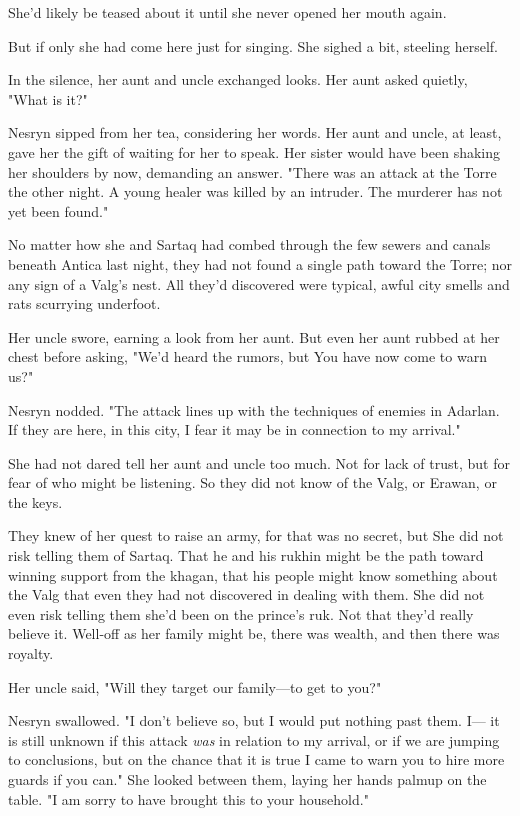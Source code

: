 She'd likely be teased about it until she never opened her mouth again.

But if only she had come here just for singing. She sighed a bit, steeling herself.

In the silence, her aunt and uncle exchanged looks. Her aunt asked quietly, "What is it?"

Nesryn sipped from her tea, considering her words. Her aunt and uncle, at least, gave her the gift of waiting for her to speak. Her sister would have been shaking her shoulders by now, demanding an answer. "There was an attack at the Torre the other night. A young healer was killed by an intruder. The murderer has not yet been found."

No matter how she and Sartaq had combed through the few sewers and canals beneath Antica last night, they had not found a single path toward the Torre; nor any sign of a Valg's nest. All they'd discovered were typical, awful city smells and rats scurrying underfoot.

Her uncle swore, earning a look from her aunt. But even her aunt rubbed at her chest before asking, "We'd heard the rumors, but  You have now come to warn us?"

Nesryn nodded. "The attack lines up with the techniques of enemies in Adarlan. If they are here, in this city, I fear it may be in connection to my arrival."

She had not dared tell her aunt and uncle too much. Not for lack of trust, but for fear of who might be listening. So they did not know of the Valg, or Erawan, or the keys.

They knew of her quest to raise an army, for that was no secret, but
 She did not risk telling them of Sartaq. That he and his rukhin might be the path toward winning support from the khagan, that his people might know something about the Valg that even they had not discovered in dealing with them. She did not even risk telling them she'd been on the prince's ruk. Not that they'd really believe it. Well-off as her family might be, there was wealth, and then there was royalty.

Her uncle said, "Will they target our family---to get to you?"

Nesryn swallowed. "I don't believe so, but I would put nothing past them. I--- it is still unknown if this attack \emph{was} in relation to my arrival, or if we are jumping to conclusions, but on the chance that it is true  I came to warn you to hire more guards if you can." She looked between them, laying her hands palmup on the table. "I am sorry to have brought this to your household."

